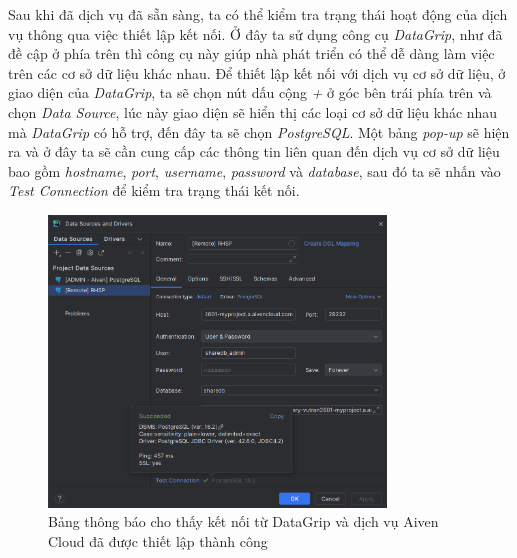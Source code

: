 Sau khi đã dịch vụ đã sẵn sàng, ta có thể kiểm tra trạng thái hoạt động của dịch vụ thông qua việc thiết lập kết nối. Ở đây ta sử dụng công cụ \textit{DataGrip}, như đã đề cập ở phía trên thì công cụ này giúp nhà phát triển có thể dễ dàng làm việc trên các cơ sở dữ liệu khác nhau. Để thiết lập kết nối với dịch vụ cơ sở dữ liệu, ở giao diện của \textit{DataGrip}, ta sẽ chọn nút dấu cộng \textit{+} ở góc bên trái phía trên và chọn \textit{Data Source}, lúc này giao diện sẽ hiển thị các loại cơ sở dữ liệu khác nhau mà \textit{DataGrip} có hỗ trợ, đến đây ta sẽ chọn \textit{PostgreSQL}. Một bảng \textit{pop-up} sẽ hiện ra và ở đây ta sẽ cần cung cấp các thông tin liên quan đến dịch vụ cơ sở dữ liệu bao gồm \textit{hostname}, \textit{port}, \textit{username}, \textit{password} và \textit{database}, sau đó ta sẽ nhấn vào \textit{Test Connection} để kiểm tra trạng thái kết nối.
\begin{figure}[H]
    \centering
    \includegraphics[width=0.8\textwidth]{Images/Deployment/Database/SuccessfulConnection.png}
    \caption{Bảng thông báo cho thấy kết nối từ DataGrip và dịch vụ Aiven Cloud đã được thiết lập thành công}
\end{figure}
